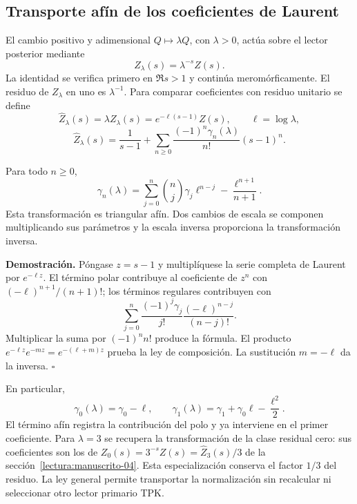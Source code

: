 \subsection{Transporte afín de los coeficientes de Laurent}
\label{ix-add:stieltjes}

El cambio positivo y adimensional $Q\mapsto\lambda Q$, con
$\lambda>0$, actúa sobre el lector posterior mediante
\[
 Z_\lambda(s)=\lambda^{-s}Z(s).
\]
La identidad se verifica primero en $\Re s>1$ y continúa
meromórficamente. El residuo de $Z_\lambda$ en uno es $\lambda^{-1}$.
Para comparar coeficientes con residuo unitario se define
\[
 \widehat Z_\lambda(s)=\lambda Z_\lambda(s)
 =e^{-\ell(s-1)}Z(s),\qquad \ell=\log\lambda,
\]
\[
 \widehat Z_\lambda(s)=\frac1{s-1}
 +\sum_{n\geq0}\frac{(-1)^n\gamma_n(\lambda)}{n!}(s-1)^n.
\]

Para todo $n\geq0$,
\[
 \gamma_n(\lambda)=
 \sum_{j=0}^{n}\binom nj\gamma_j\ell^{n-j}
 -\frac{\ell^{n+1}}{n+1}.
\]
Esta transformación es triangular afín. Dos cambios de escala se
componen multiplicando sus parámetros y la escala inversa proporciona
la transformación inversa.

\textbf{Demostración.} Póngase $z=s-1$ y multiplíquese la serie
completa de Laurent por $e^{-\ell z}$. El término polar contribuye al
coeficiente de $z^n$ con $(-\ell)^{n+1}/(n+1)!$; los términos regulares
contribuyen con
\[
 \sum_{j=0}^n\frac{(-1)^j\gamma_j}{j!}
                    \frac{(-\ell)^{n-j}}{(n-j)!}.
\]
Multiplicar la suma por $(-1)^nn!$ produce la fórmula. El producto
$e^{-\ell z}e^{-mz}=e^{-(\ell+m)z}$ prueba la ley de composición.
La sustitución $m=-\ell$ da la inversa. \hfill$\square$

En particular,
\[
 \gamma_0(\lambda)=\gamma_0-\ell,\qquad
 \gamma_1(\lambda)=\gamma_1+\gamma_0\ell-\frac{\ell^2}{2}.
\]
El término afín registra la contribución del polo y ya interviene en el
primer coeficiente. Para $\lambda=3$ se recupera la transformación de
la clase residual cero: sus coeficientes son los de
$Z_0(s)=3^{-s}Z(s)=\widehat Z_3(s)/3$ de la
sección~\ref{lectura:manuscrito-04}. Esta especialización conserva
el factor $1/3$ del residuo. La ley general permite transportar la
normalización sin recalcular ni seleccionar otro lector primario TPK.
